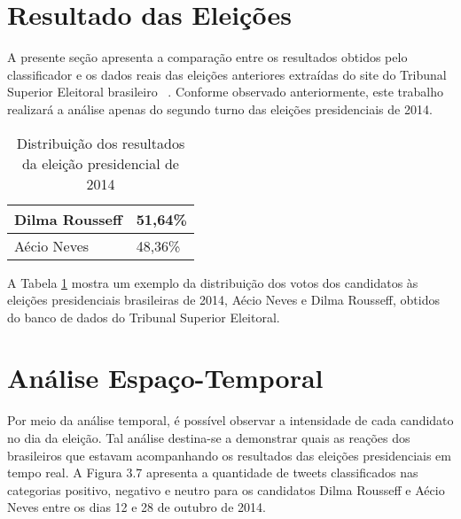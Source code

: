  
 
 \section{Resultado das Eleições}
 
A presente seção apresenta a comparação
 entre os resultados obtidos pelo classificador e os dados
 reais das eleições anteriores extraídas do site do
 Tribunal Superior  Eleitoral brasileiro ~\cite{TSE}. Conforme observado anteriormente, este trabalho realizará a análise apenas do segundo turno das eleições presidenciais de 2014.
 
 \begin{table}[tbp]
     \centering
     \caption{Distribuição dos resultados da eleição presidencial de 2014}
     \label{tb:eleicoes2014}
     \begin{tabular}{ll}
     \hline
     Dilma Rousseff & 51,64\% \\ \hline
     Aécio Neves & 48,36\% \\ \hline
     \end{tabular}
 \end{table}
 
 A Tabela \ref{tb:eleicoes2014} mostra um exemplo da distribuição dos votos
 dos candidatos às eleições presidenciais brasileiras de 2014,
 Aécio Neves e Dilma Rousseff, obtidos do banco de dados do
 Tribunal Superior Eleitoral.
 
 
 
 
 \section{Análise Espaço-Temporal}
 
 
 Por meio da análise temporal, é possível observar a intensidade de cada candidato no dia da eleição. Tal análise destina-se a demonstrar quais as reações dos brasileiros que estavam acompanhando os resultados das eleições presidenciais em tempo real. A Figura 3.7 apresenta a quantidade de tweets classificados nas categorias positivo, negativo e neutro para os candidatos Dilma Rousseff e Aécio Neves entre os dias 12 e 28 de outubro de 2014.
 
